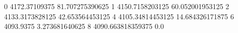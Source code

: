 0 4172.37109375 81.707275390625
1 4150.7158203125 60.052001953125
2 4133.3173828125 42.653564453125
4 4105.34814453125 14.684326171875
6 4093.9375 3.273681640625
8 4090.663818359375 0.0
